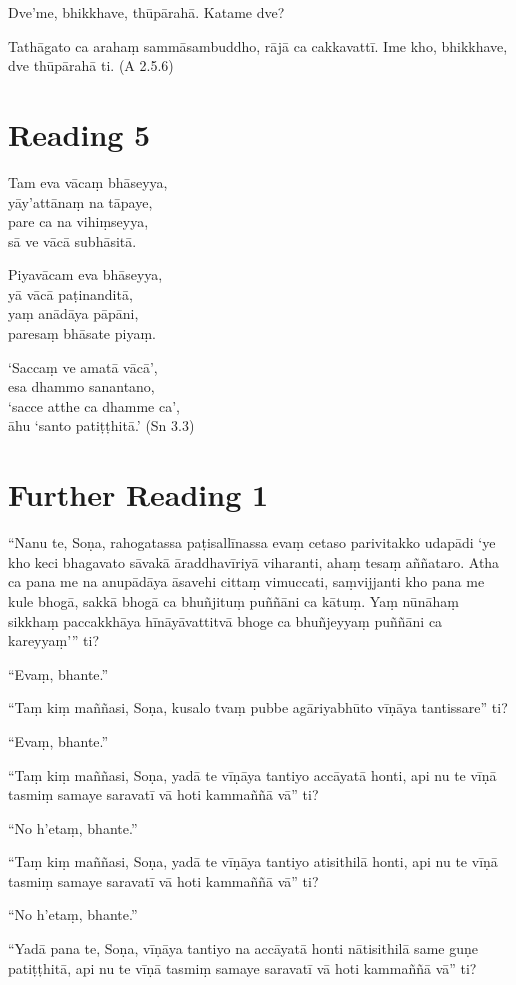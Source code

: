 Dve’me, bhikkhave, thūpārahā. Katame dve?

Tathāgato ca arahaṃ sammāsambuddho, rājā ca cakkavattī. Ime kho, bhikkhave, dve thūpārahā ti. \hfill(A 2.5.6)

\section*{Reading 5}

Tam eva vācaṃ bhāseyya,\\
yāy’attānaṃ na tāpaye,\\
pare ca na vihiṃseyya,\\
sā ve vācā subhāsitā.

Piyavācam eva bhāseyya,\\
yā vācā paṭinanditā,\\
yaṃ anādāya pāpāni,\\
paresaṃ bhāsate piyaṃ.

‘Saccaṃ ve amatā vācā’,\\
esa dhammo sanantano,\\
‘sacce atthe ca dhamme ca’,\\
āhu ‘santo patiṭṭhitā.’ \hfill(Sn 3.3)

\section*{Further Reading 1}

“Nanu te, Soṇa, rahogatassa paṭisallīnassa evaṃ cetaso parivitakko udapādi ‘ye kho keci bhagavato sāvakā āraddhavīriyā viharanti, ahaṃ tesaṃ aññataro. Atha ca pana me na anupādāya āsavehi cittaṃ vimuccati, saṃvijjanti kho pana me kule bhogā, sakkā bhogā ca bhuñjituṃ puññāni ca kātuṃ. Yaṃ nūnāhaṃ sikkhaṃ paccakkhāya hīnāyāvattitvā bhoge ca bhuñjeyyaṃ puññāni ca kareyyaṃ’” ti?

“Evaṃ, bhante.”

“Taṃ kiṃ maññasi, Soṇa, kusalo tvaṃ pubbe agāriyabhūto vīṇāya tantissare” ti?

“Evaṃ, bhante.”

“Taṃ kiṃ maññasi, Soṇa, yadā te vīṇāya tantiyo accāyatā honti, api nu te vīṇā tasmiṃ samaye saravatī vā hoti kammaññā vā” ti?

“No h’etaṃ, bhante.”

“Taṃ kiṃ maññasi, Soṇa, yadā te vīṇāya tantiyo atisithilā honti, api nu te vīṇā tasmiṃ samaye saravatī vā hoti kammaññā vā” ti?

“No h’etaṃ, bhante.”

“Yadā pana te, Soṇa, vīṇāya tantiyo na accāyatā honti nātisithilā same guṇe patiṭṭhitā, api nu te vīṇā tasmiṃ samaye saravatī vā hoti kammaññā vā” ti?

